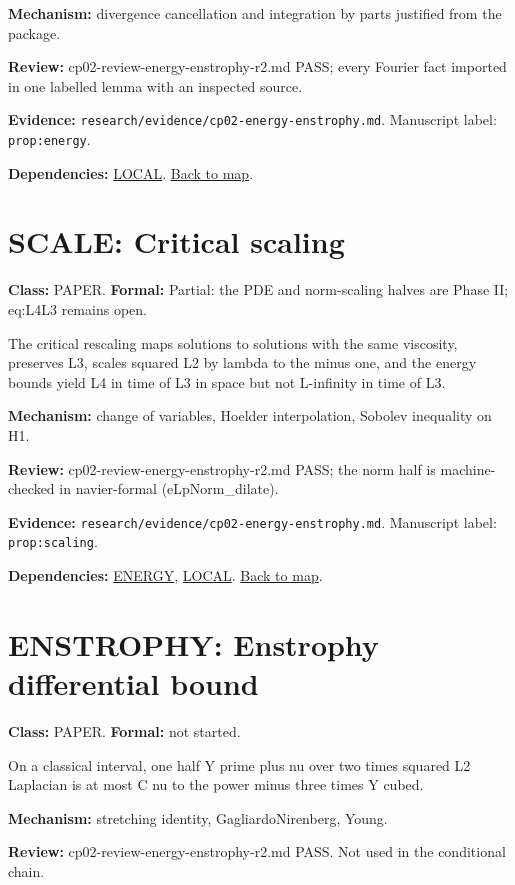 \documentclass[10pt]{article}
\begin{document}
\textbf{Mechanism:} divergence cancellation and integration by parts justified from the package.

\textbf{Review:} cp02-review-energy-enstrophy-r2.md PASS; every Fourier fact imported in one labelled lemma with an inspected source.

\textbf{Evidence:} \texttt{research/evidence/cp02-energy-enstrophy.md}. Manuscript label: \texttt{prop:energy}.

\textbf{Dependencies:} \hyperref[node:LOCAL]{LOCAL}. \hyperref[map]{Back to map}.

\section*{SCALE: Critical scaling}\label{node:SCALE}
\textbf{Class:} PAPER. \textbf{Formal:} Partial: the PDE and norm-scaling halves are Phase II; eq:L4L3 remains open.

The critical rescaling maps solutions to solutions with the same viscosity, preserves L3, scales squared L2 by lambda to the minus one, and the energy bounds yield L4 in time of L3 in space but not L-infinity in time of L3.

\textbf{Mechanism:} change of variables, Hoelder interpolation, Sobolev inequality on H1.

\textbf{Review:} cp02-review-energy-enstrophy-r2.md PASS; the norm half is machine-checked in navier-formal (eLpNorm\_dilate).

\textbf{Evidence:} \texttt{research/evidence/cp02-energy-enstrophy.md}. Manuscript label: \texttt{prop:scaling}.

\textbf{Dependencies:} \hyperref[node:ENERGY]{ENERGY}, \hyperref[node:LOCAL]{LOCAL}. \hyperref[map]{Back to map}.

\section*{ENSTROPHY: Enstrophy differential bound}\label{node:ENSTROPHY}
\textbf{Class:} PAPER. \textbf{Formal:} not started.

On a classical interval, one half Y prime plus nu over two times squared L2 Laplacian is at most C nu to the power minus three times Y cubed.

\textbf{Mechanism:} stretching identity, Gagliardo\textendash{}\allowbreak{}Nirenberg, Young.

\textbf{Review:} cp02-review-energy-enstrophy-r2.md PASS. Not used in the conditional chain.
\end{document}
